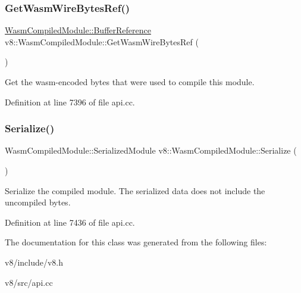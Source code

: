 \mbox{\label{classv8_1_1WasmCompiledModule_ad23a7cac4e5b5ccd988dc5e29cc819b6}} 
\subsubsection{\texorpdfstring{Get\+Wasm\+Wire\+Bytes\+Ref()}{GetWasmWireBytesRef()}}
{\footnotesize\ttfamily \mbox{\hyperlink{structv8_1_1WasmCompiledModule_1_1BufferReference}{Wasm\+Compiled\+Module\+::\+Buffer\+Reference}} v8\+::\+Wasm\+Compiled\+Module\+::\+Get\+Wasm\+Wire\+Bytes\+Ref (\begin{DoxyParamCaption}{ }\end{DoxyParamCaption})}

Get the wasm-\/encoded bytes that were used to compile this module. 

Definition at line 7396 of file api.\+cc.

\mbox{\label{classv8_1_1WasmCompiledModule_a9750caa21b43b72f799d304857cbb6b0}} 
\subsubsection{\texorpdfstring{Serialize()}{Serialize()}}
{\footnotesize\ttfamily Wasm\+Compiled\+Module\+::\+Serialized\+Module v8\+::\+Wasm\+Compiled\+Module\+::\+Serialize (\begin{DoxyParamCaption}{ }\end{DoxyParamCaption})}

Serialize the compiled module. The serialized data does not include the uncompiled bytes. 

Definition at line 7436 of file api.\+cc.



The documentation for this class was generated from the following files\+:\begin{DoxyCompactItemize}
\item 
v8/include/v8.\+h\item 
v8/src/api.\+cc\end{DoxyCompactItemize}
